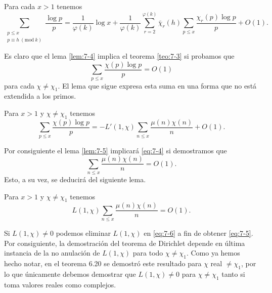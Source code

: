 \documentclass[12pt,a4paper]{book}
\begin{document}
    \begin{lema}\label{lem:7-4}
        Para cada $x>1$ tenemos
        \begin{equation*}
            \sum_{\substack{p\leq x\\p\equiv h\ (\mathrm{mod}\ k)}}\frac{\log p}{p}
            =\frac{1}{\varphi(k)}\log x+\frac{1}{\varphi(k)}\sum_{r=2}^{\varphi(k)}
            \bar{\chi}_{r}(h)\sum_{p\leq x}\frac{\chi_{r}(p)\log p}{p}+O(1).
        \end{equation*}
    \end{lema}

    Es claro que el lema \ref{lem:7-4} implica el teorema \ref{teo:7-3} si probamos que
    \begin{equation}\label{eq:7-4}
        \sum_{p\leq x}\frac{\chi(p)\log p}{p}=O(1)
    \end{equation}
    para cada $\chi\neq\chi_{1}$. El lema que sigue expresa esta suma en una forma que no
    está extendida a los primos.

    \begin{lema}\label{lem:7-5}
        Para $x>1$ y $\chi\neq\chi_{1}$ tenemos
        \begin{equation*}
            \sum_{p\leq x}\frac{\chi(p)\log p}{p}=-L'(1,\chi)\sum_{n\leq x}\frac{\mu(n)\chi(n)}{n}+O(1).
        \end{equation*}
    \end{lema}

    Por consiguiente el lema \ref{lem:7-5} implicará \eqref{eq:7-4} si demostramos que
    \begin{equation}\label{eq:7-5}
        \sum_{n\leq x}\frac{\mu(n)\chi(n)}{n}=O(1).
    \end{equation}
    Esto, a su vez, se deducirá del siguiente lema.

    \begin{lema}\label{lem:7-6}
        Para $x>1$ y $\chi\neq\chi_{1}$ tenemos
        \begin{equation}\label{eq:7-6}
            L(1,\chi)\sum_{n\leq x}\frac{\mu(n)\chi(n)}{n}=O(1).
        \end{equation}
    \end{lema}

    Si $L(1,\chi)\neq0$ podemos eliminar $L(1,\chi)$ en \eqref{eq:7-6} a fin de obtener
    \eqref{eq:7-5}. Por consiguiente, la demostración del teorema de Dirichlet depende en
    última instancia de la no anulación de $L(1,\chi)$ para todo $\chi\neq\chi_{1}$. Como ya
    hemos hecho notar, en el teorema 6.20 se demostró este resultado para $\chi$ real
    $\neq\chi_{1}$, por lo que únicamente debemos demostrar que $L(1,\chi)\neq0$ para
    $\chi\neq\chi_{1}$ tanto si toma valores reales como complejos.
\end{document}
